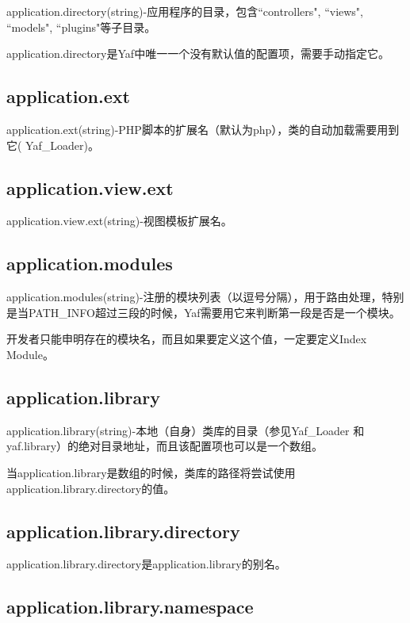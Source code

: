 application.directory(string)-应用程序的目录，包含``controllers", ``views", ``models", ``plugins"等子目录。

application.directory是Yaf中唯一一个没有默认值的配置项，需要手动指定它。

\subsection{application.ext}

application.ext(string)-PHP脚本的扩展名（默认为php），类的自动加载需要用到它( Yaf\_Loader)。

\subsection{application.view.ext}

application.view.ext(string)-视图模板扩展名。

\subsection{application.modules}


application.modules(string)-注册的模块列表（以逗号分隔），用于路由处理，特别是当PATH\_INFO超过三段的时候，Yaf需要用它来判断第一段是否是一个模块。

开发者只能申明存在的模块名，而且如果要定义这个值，一定要定义Index Module。

\subsection{application.library}

application.library(string)-本地（自身）类库的目录（参见Yaf\_Loader 和 yaf.library）的绝对目录地址，而且该配置项也可以是一个数组。

当application.library是数组的时候，类库的路径将尝试使用application.library.directory的值。

\subsection{application.library.directory}

application.library.directory是application.library的别名。

\subsection{application.library.namespace}

